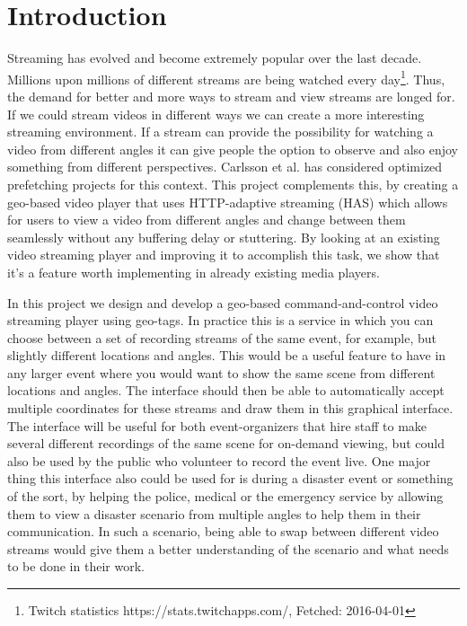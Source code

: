 \chapter{Introduction}
\label{cha:introduction}

Streaming has evolved and become extremely popular over the last decade. Millions upon millions of different streams are being watched every day\footnote{Twitch statistics https://stats.twitchapps.com/, Fetched: 2016-04-01}. Thus, the demand for better and more ways to stream and view streams are longed for. If we could stream videos in different ways we can create a more interesting streaming environment. If a stream can provide the possibility for watching a video from different angles it can give people the option to observe and also enjoy something from different perspectives. Carlsson et al.\cite{optimizedstreaming} has considered optimized prefetching projects for this context. This project complements this, by creating a geo-based video player that uses HTTP-adaptive streaming (HAS) which allows for users to view a video from different angles and change between them seamlessly without any buffering delay or stuttering. By looking at an existing video streaming player and improving it to accomplish this task, we show that it's a feature worth implementing in already existing media players.

In this project we design and develop a geo-based command-and-control video streaming player using geo-tags. In practice this is a service in which you can choose between a set of recording streams of the same event, for example, but slightly different locations and angles. This would be a useful feature to have in any larger event where you would want to show the same scene from different locations and angles. The interface should then be able to automatically accept multiple coordinates for these streams and draw them in this graphical interface. The interface will be useful for both event-organizers that hire staff to make several different recordings of the same scene for on-demand viewing, but could also be used by the public who volunteer to record the event live. One major thing this interface also could be used for is during a disaster event or something of the sort, by helping the police, medical or the emergency service by allowing them to view a disaster scenario from multiple angles to help them in their communication. In such a scenario, being able to swap between different video streams would give them a better understanding of the scenario and what needs to be done in their work.

